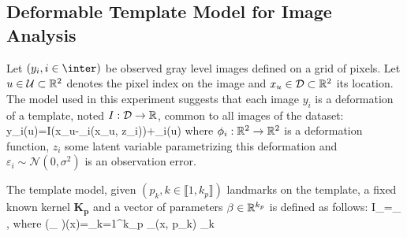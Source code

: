 \documentclass[11pt]{article}
\theoremstyle{t}
\begin{document}
\subsection{Deformable Template Model for Image Analysis}
Let $(y_i, i \in \inter)$ be observed gray level images defined on a grid of pixels.
Let $u \in \mathcal{U} \subset \rset^2$ denotes the pixel index on the image and $x_u \in \mathcal{D} \subset \rset^2$ its location.
The model used in this experiment suggests that each image $y_i$ is a deformation of a template, noted $I: \mathcal{D} \to \rset$, common to all images of the dataset:
\beq\label{eq:deformablemodel}
y_{i}(u)=I\left(x_{u}-\Phi_{i}\left(x_{u}, z_i\right)\right)+\varepsilon_{i}(u)
\eeq
where $\phi_i: \rset^2 \to \rset^2$ is a deformation function, $z_i$ some latent variable parametrizing this deformation and $\varepsilon_{i} \sim \mathcal{N}(0,\sigma^2)$ is an observation error.

The template model, given $(p_k, k \in \llbracket 1, k_p \rrbracket)$ landmarks on the template, a fixed known kernel $\mathbf{K}_{\mathbf{p}}$ and a vector of parameters $\beta \in \rset^{k_p}$ is defined as follows:
\beq
I_{\xi}=_{} \beta, \quad \textrm{where} \quad \left(_{} \beta \right)(x)=\sum_{k=1}^{k_{p}} _{}\left(x, p_{k}\right) \beta_k
\eeq
\end{document}
